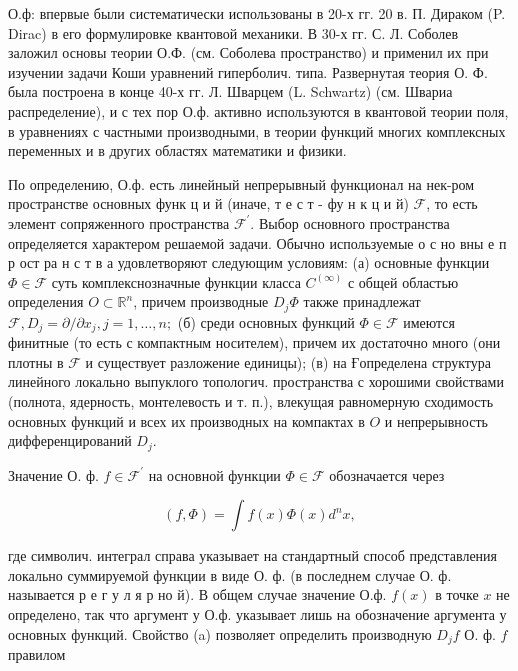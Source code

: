 \documentclass[10pt]{article}
\begin{document}
О.ф: впервые были систематически использованы в 20-х гг. 20 в. П. Дираком (P. Dirac) в его формулировке квантовой механики. В 30-х гг. С. Л. Соболев заложил основы теории О.Ф. (см. Соболева пространство) и применил их при изучении задачи Коши уравнений гиперболич. типа. Развернутая теория О. Ф. была построена в конце 40-х гг. Л. Шварцем (L. Schwartz) (см. Швариа распределение), и с тех пор О.ф. активно используются в квантовой теории поля, в уравнениях с частными производными, в теории функций многих комплексных переменных и в других областях математики и физики.



По определению, О.ф. есть линейный непрерывный функционал на нек-ром пространстве основных функ ц и й (иначе, т е с т - фу н к ц и й) $\mathscr{F}$, то есть элемент сопряженного пространства $\mathscr{F}^{\prime}$. Выбор основного пространства определяется характером решаемой задачи. Обычно используемые о с но вны е п р ост ра н с т в а удовлетворяют следующим условиям: (а) основные функции $\Phi \in \mathscr{F}$ суть комплекснозначные функции класса $C^{(\infty)}$ с общей областью определения $O \subset \mathbb{R}^{n}$, причем производные $D_{j} \Phi$ также принадлежат $\mathscr{F}, D_{j}=\partial / \partial x_{j}, j=1, \ldots, n ;$ (б) среди основных функций $\Phi \in \mathscr{F}$ имеются финитные (то есть с компактным носителем), причем их достаточно много (они плотны в $\mathscr{F}$ и существует разложение единицы); (в) на Ғопределена структура линейного локально выпуклого топологич. пространства с хорошими свойствами (полнота, ядерность, монтелевость и т. п.), влекущая равномерную сходимость основных функций и всех их производных на компактах в $O$ и непрерывность дифференцирований $D_{j}$.



Значение О. ф. $f \in \mathscr{F}^{\prime}$ на основной функции $\Phi \in \mathscr{F}$ обозначается через



\[

(f, \Phi)=\int f(x) \Phi(x) d^{n} x,

\]



где символич. интеграл справа указывает на стандартный способ представления локально суммируемой функции в виде О. ф. (в последнем случае О. ф. называется р е г у л я р но й). В общем случае значение О.ф. $f(x)$ в точке $x$ не определено, так что аргумент у О.ф. указывает лишь на обозначение аргумента у основных функций. Свойство (a) позволяет определить производную $D_{j} f$ О. ф. $f$ правилом
\end{document}
